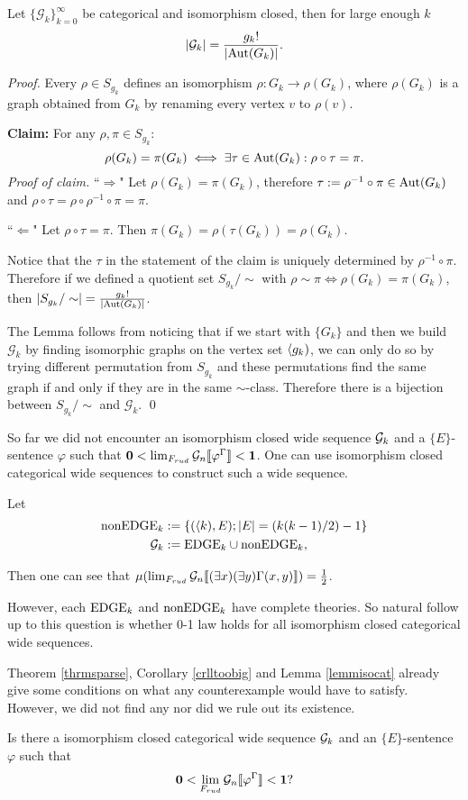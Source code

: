 \begin{lemm}
Let $\{\mathcal{G}_k\}_{k=0}^\infty$ be categorical and isomorphism closed, then for large enough $k$
\[\left|{\mathcal{G}_k}\right|=\frac{g_k!}{\left|{\text{Aut}(G_k)}\right|}.\]
\end{lemm}
\begin{proof}
Every $\rho\in S_{g_k}$ defines an isomorphism $\rho:G_k\to\rho(G_k)$, where $\rho(G_k)$ is a graph obtained from $G_k$ by renaming every vertex $v$ to $\rho(v)$.

{}
\textbf{Claim:} For any $\rho,\pi\in S_{g_k}$:
\[\rho(G_k)=\pi(G_k)\iff\exists \tau\in\text{Aut}(G_k):\rho\circ\tau=\pi.\]
\textit{Proof of claim.} ``$\Rightarrow$" Let $\rho(G_k)=\pi(G_k)$, therefore $\tau:=\rho^{-1}\circ\pi\in\text{Aut}(G_k)$ and $\rho\circ\tau=\rho\circ\rho^{-1}\circ\pi=\pi.$

``$\Leftarrow$" Let $\rho\circ\tau=\pi$. Then $\pi(G_k)=\rho(\tau(G_k))=\rho(G_k).$ \qedhere

Notice that the $\tau$ in the statement of the claim is uniquely determined by $\rho^{-1}\circ\pi$. Therefore if we defined a quotient set $S_{g_k}/\sim$ with $\rho\sim\pi\iff\rho(G_k)=\pi(G_k)$, then $\left|{S_{g_k}/\sim}\right|=\frac{g_k!}{\left|{\text{Aut}(G_k)}\right|}$.

The Lemma follows from noticing that if we start with $\{G_k\}$ and then we build $\mathcal{G}_k$ by finding isomorphic graphs on the vertex set $\langle g_k)$, we can only do so by trying different permutation from $S_{g_k}$ and these permutations find the same graph if and only if they are in the same $\sim$-class. Therefore there is a bijection between $S_{g_k}/\sim$ and $\mathcal{G}_k$. \qed
\end{proof}

So far we did not encounter an isomorphism closed wide sequence $\mathcal{G}_k$ and a $\{E\}$-sentence $\varphi$ such that $\textbf{0}<\lim_{F_{rud}}\mathcal{G}_n\llbracket\varphi^\Gamma\rrbracket<\textbf{1}$. One can use isomorphism closed categorical wide sequences to construct such a wide sequence.
\begin{exam}
Let
\begin{align}
\text{nonEDGE}_k&:=\{(\langle k),E);\left|{E}\right|=(k(k-1)/2)-1\}\\
\mathcal{G}_k&:=\text{EDGE}_k\cup\text{nonEDGE}_k,
\end{align}

Then one can see that $\mu(\lim_{F_{rud}}\mathcal{G}_n\llbracket(\exists x)(\exists y)\Gamma(x,y)\rrbracket)=\frac{1}{2}$.
\end{exam}

However, each $\text{EDGE}_k$ and $\text{nonEDGE}_k$ have complete theories. So natural follow up to this question is whether 0-1 law holds for all isomorphism closed categorical wide sequences. 

Theorem \ref{thrmsparse}, Corollary \ref{crlltoobig} and Lemma \ref{lemmisocat} already give some conditions on what any counterexample would have to satisfy. However, we did not find any nor did we rule out its existence. 

\begin{ques}
Is there a isomorphism closed categorical wide sequence $\mathcal{G}_k$ and an $\{E\}$-sentence $\varphi$ such that
\[\textbf{0}<\lim_{F_{rud}}\mathcal{G}_n\llbracket\varphi^\Gamma\rrbracket<\textbf{1}?\]
\end{ques}
